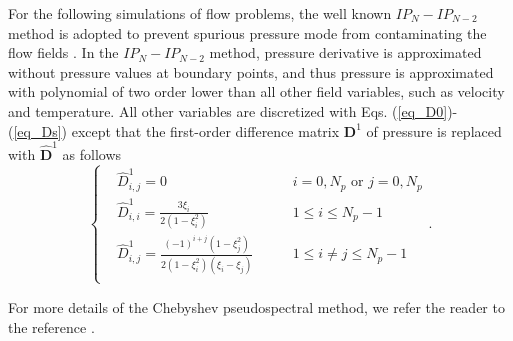 \documentclass[preprint, 10pt]{elsarticle}
\begin{document}
For the following simulations of flow problems, the well known $IP_N-IP_{N-2}$ method \cite{zhang2010explicit} is adopted to prevent spurious pressure mode from
contaminating the flow fields \cite{peyret2013spectral}. In the $IP_N-IP_{N-2}$ method, pressure derivative is approximated without pressure values at boundary points, and thus pressure is approximated with polynomial of two order lower than all other field variables, such as velocity and temperature. All other variables are discretized with Eqs. (\ref{eq_D0})-(\ref{eq_Ds}) except that the first-order difference matrix $\mathbf{D}^{1}$ of pressure is replaced with $\hat {\mathbf{D}}^1$ as follows
\begin{equation}
\left\{ \begin{aligned}
&\hat D_{i,j}^1 = 0                              & i=0,N_p \text{  or } j=0, N_p \\
&\hat D_{i,i}^1 = \frac{3\xi_i}{2(1-\xi_i^{2})}  & 1 \le i \le N_p-1\\
&\hat D_{i,j}^1 = \frac{(-1)^{i+j}(1-\xi_j^{2})}
{2(1-\xi_i^{2})(\xi_i-\xi_j)} \qquad             & 1 \le i \ne j \le N_p-1\\
\end{aligned} \right. .
\label{eq_D1}
\end{equation}


For more details of the Chebyshev pseudospectral method, we refer the reader to the reference \cite{peyret2013spectral, chen2018multidomain, chen2020parallel}.
\end{document}
